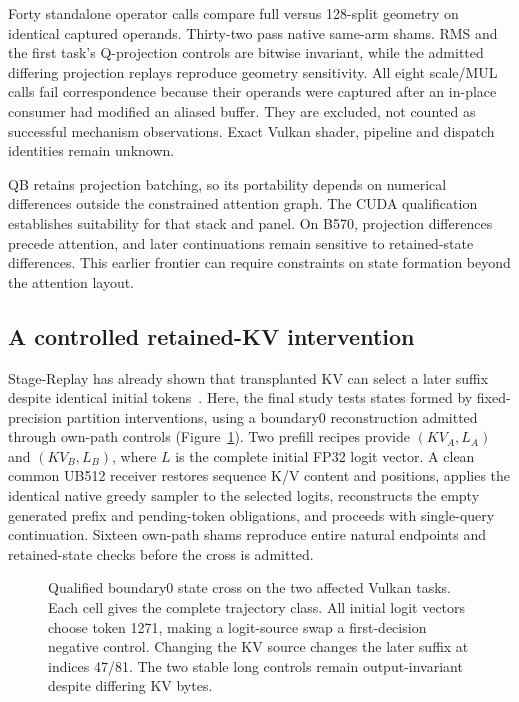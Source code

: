 Forty standalone operator calls compare full versus 128-split geometry on identical captured operands. Thirty-two pass native same-arm shams. RMS and the first task's Q-projection controls are bitwise invariant, while the admitted differing projection replays reproduce geometry sensitivity. All eight scale/MUL calls fail correspondence because their operands were captured after an in-place consumer had modified an aliased buffer. They are excluded, not counted as successful mechanism observations. Exact Vulkan shader, pipeline and dispatch identities remain unknown.

QB retains projection batching, so its portability depends on numerical differences outside the constrained attention graph. The CUDA qualification establishes suitability for that stack and panel. On B570, projection differences precede attention, and later continuations remain sensitive to retained-state differences. This earlier frontier can require constraints on state formation beyond the attention layout.

\subsection{A controlled retained-KV intervention}
Stage-Replay has already shown that transplanted KV can select a later suffix despite identical initial tokens~\cite{stagereplay}. Here, the final study tests states formed by fixed-precision partition interventions, using a boundary0 reconstruction admitted through own-path controls (Figure~\ref{fig:state}). Two prefill recipes provide $(KV_A,L_A)$ and $(KV_B,L_B)$, where $L$ is the complete initial FP32 logit vector. A clean common UB512 receiver restores sequence K/V content and positions, applies the identical native greedy sampler to the selected logits, reconstructs the empty generated prefix and pending-token obligations, and proceeds with single-query continuation. Sixteen own-path shams reproduce entire natural endpoints and retained-state checks before the cross is admitted.

\begin{figure}[t]
\centering
\caption{Qualified boundary0 state cross on the two affected Vulkan tasks. Each cell gives the complete trajectory class. All initial logit vectors choose token 1271, making a logit-source swap a first-decision negative control. Changing the KV source changes the later suffix at indices 47/81. The two stable long controls remain output-invariant despite differing KV bytes.}
\label{fig:state}
\end{figure}

